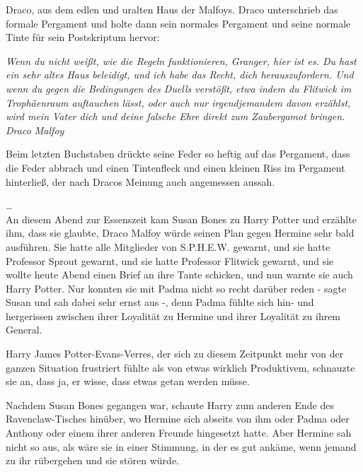 {Draco, aus dem edlen und uralten Haus der Malfoys. Draco unterschrieb das formale Pergament und holte dann sein normales Pergament und seine normale Tinte für sein Postskriptum hervor:

\emph{Wenn du nicht weißt, wie die Regeln funktionieren, Granger, hier ist es. Du hast ein sehr altes Haus beleidigt, und ich habe das Recht, dich herauszufordern. Und wenn du gegen die Bedingungen des Duells verstößt, etwa indem du Flitwick im Trophäenraum auftauchen lässt, oder auch nur irgendjemandem davon erzählst, wird mein Vater dich und deine falsche Ehre direkt zum Zaubergamot bringen.}\\ \emph{Draco Malfoy}

Beim letzten Buchstaben drückte seine Feder so heftig auf das Pergament, dass die Feder abbrach und einen Tintenfleck und einen kleinen Riss im Pergament hinterließ, der nach Dracos Meinung auch angemessen aussah.

…\\ An diesem Abend zur Essenszeit kam Susan Bones zu Harry Potter und erzählte ihm, dass sie glaubte, Draco Malfoy würde seinen Plan gegen Hermine sehr bald ausführen. Sie hatte alle Mitglieder von S.P.H.E.W. gewarnt, und sie hatte Professor Sprout gewarnt, und sie hatte Professor Flitwick gewarnt, und sie wollte heute Abend einen Brief an ihre Tante schicken, und nun warnte sie auch Harry Potter. Nur konnten sie mit Padma nicht so recht darüber reden - sagte Susan und sah dabei sehr ernst aus -, denn Padma fühlte sich hin- und hergerissen zwischen ihrer Loyalität zu Hermine und ihrer Loyalität zu ihrem General.

Harry James Potter-Evans-Verres, der sich zu diesem Zeitpunkt mehr von der ganzen Situation frustriert fühlte als von etwas wirklich Produktivem, schnauzte sie an, dass ja, er wisse, dass etwas getan werden müsse.

Nachdem Susan Bones gegangen war, schaute Harry zum anderen Ende des Ravenclaw-Tisches hinüber, wo Hermine sich abseits von ihm oder Padma oder Anthony oder einem ihrer anderen Freunde hingesetzt hatte. Aber Hermine sah nicht so aus, als wäre sie in einer Stimmung, in der es gut ankäme, wenn jemand zu ihr rübergehen und sie stören würde.

}
